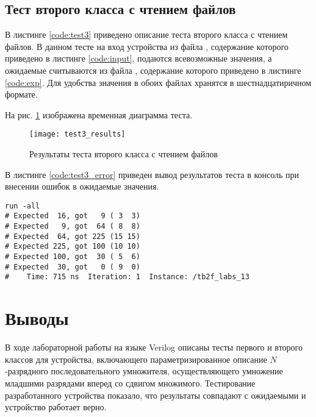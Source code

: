 \subsection{Тест второго класса с чтением файлов}

В листинге \ref{code:test3} приведено описание теста второго класса с чтением файлов. В данном тесте на вход устройства из файла , содержание которого приведено в листинге \ref{code:input}, подаются всевозможные значения, а ожидаемые считываются из файла , содержание которого приведено в листинге \ref{code:exp}. Для удобства значения в обоих файлах хранятся в шестнадцатиричном формате.

\begin{multicols}{2}
		
	
\end{multicols}

На рис. \ref{fig:test3_results} изображена временная диаграмма теста.
\vspace{-0.5cm}
\begin{figure}[H]
	\begin{center}
		\texttt{[image: test3\_results]}
		\caption{Результаты теста второго класса с чтением файлов}
		\label{fig:test3_results}
	\end{center}
\end{figure}
\vspace{-0.5cm}

В листинге \ref{code:test3_error} приведен вывод результатов теста в консоль при внесении ошибок в ожидаемые значения.
\begin{lstlisting}[caption=Результаты ошибочного теста второго класса с чтением файлов, label=code:test3_error, style=console]
run -all
# Expected  16, got   9 ( 3  3)
# Expected   9, got  64 ( 8  8)
# Expected  64, got 225 (15 15)
# Expected 225, got 100 (10 10)
# Expected 100, got  30 ( 5  6)
# Expected  30, got   0 ( 9  0)
#    Time: 715 ns  Iteration: 1  Instance: /tb2f_labs_13
\end{lstlisting}

\section{Выводы}

В ходе лабораторной работы на языке Verilog описаны тесты первого и второго классов для устройства, включающего параметризированное описание $N$-разрядного последовательного умножителя, осуществляющего умножение младшими разрядами вперед со сдвигом множимого. Тестирование разработанного устройства показало, что результаты совпадают с ожидаемыми и устройство работает верно.

